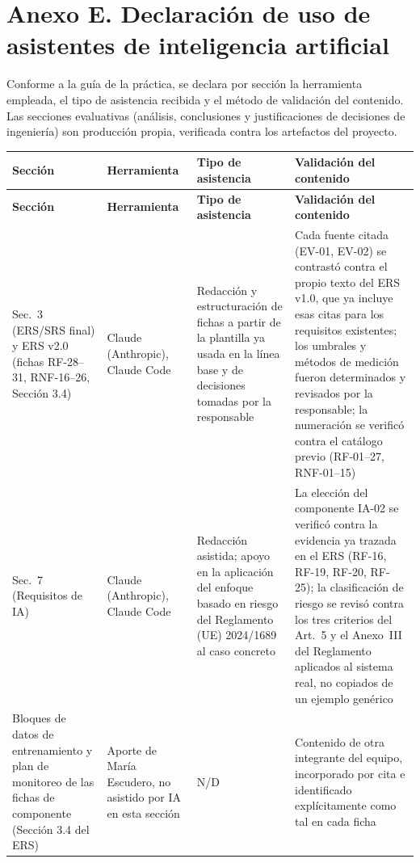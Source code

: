 \section*{Anexo E. Declaración de uso de asistentes de inteligencia artificial}

Conforme a la guía de la práctica, se declara por sección la herramienta empleada, el tipo de asistencia recibida y el método de validación del contenido. Las secciones evaluativas (análisis, conclusiones y justificaciones de decisiones de ingeniería) son producción propia, verificada contra los artefactos del proyecto.

\begin{center}
\begin{longtable}{|p{3.4cm}|p{2.6cm}|p{3.4cm}|p{5.2cm}|}
\hline
\textbf{Sección} & \textbf{Herramienta} & \textbf{Tipo de asistencia} & \textbf{Validación del contenido} \\
\hline
\endfirsthead
\hline
\textbf{Sección} & \textbf{Herramienta} & \textbf{Tipo de asistencia} & \textbf{Validación del contenido} \\
\hline
\endhead
\hline
\endfoot
\hline
\endlastfoot
Sec.~3 (ERS/SRS final) y ERS v2.0 (fichas RF-28--31, RNF-16--26, Sección 3.4) & Claude (Anthropic), Claude Code & Redacción y estructuración de fichas a partir de la plantilla ya usada en la línea base y de decisiones tomadas por la responsable & Cada fuente citada (EV-01, EV-02) se contrastó contra el propio texto del ERS v1.0, que ya incluye esas citas para los requisitos existentes; los umbrales y métodos de medición fueron determinados y revisados por la responsable; la numeración se verificó contra el catálogo previo (RF-01--27, RNF-01--15) \\
\hline
Sec.~7 (Requisitos de IA) & Claude (Anthropic), Claude Code & Redacción asistida; apoyo en la aplicación del enfoque basado en riesgo del Reglamento (UE) 2024/1689 al caso concreto & La elección del componente IA-02 se verificó contra la evidencia ya trazada en el ERS (RF-16, RF-19, RF-20, RF-25); la clasificación de riesgo se revisó contra los tres criterios del Art.~5 y el Anexo~III del Reglamento aplicados al sistema real, no copiados de un ejemplo genérico \\
\hline
Bloques de datos de entrenamiento y plan de monitoreo de las fichas de componente (Sección 3.4 del ERS) & Aporte de María Escudero, no asistido por IA en esta sección & N/D & Contenido de otra integrante del equipo, incorporado por cita e identificado explícitamente como tal en cada ficha \\
\hline
\end{longtable}
\end{center}


